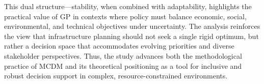 This dual structure—stability, when combined with adaptability, highlights the practical value of GP in contexts where policy must balance economic, social, environmental, and technical objectives under uncertainty. The analysis reinforces the view that infrastructure planning should not seek a single rigid optimum, but rather a decision space that accommodates evolving priorities and diverse stakeholder perspectives. Thus, the study advances both the methodological practice of MCDM and its theoretical positioning as a tool for inclusive and robust decision support in complex, resource-constrained environments.




